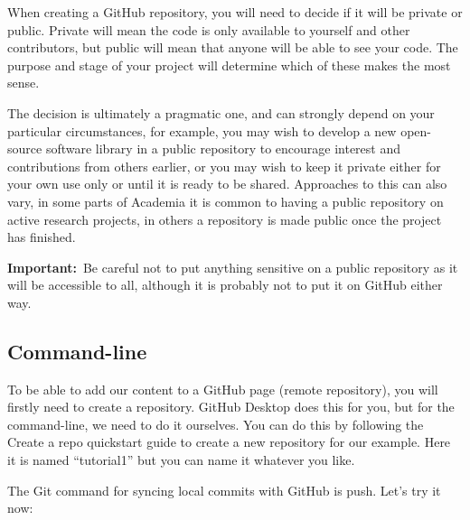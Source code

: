 \documentclass[
  letterpaper,
  DIV=11,
  numbers=noendperiod]{scrartcl}
\begin{document}
\begin{tcolorbox}[enhanced jigsaw, left=2mm, breakable, toptitle=1mm, colback=white, coltitle=black, opacitybacktitle=0.6, leftrule=.75mm, colbacktitle=quarto-callout-caution-color!10!white, rightrule=.15mm, bottomrule=.15mm, bottomtitle=1mm, titlerule=0mm, title=\textcolor{quarto-callout-caution-color}{\faFire}\hspace{0.5em}{\textbf{Private or Public Repository}}, colframe=quarto-callout-caution-color-frame, opacityback=0, arc=.35mm, toprule=.15mm]

When creating a GitHub repository, you will need to decide if it will be
private or public. Private will mean the code is only available to
yourself and other contributors, but public will mean that anyone will
be able to see your code. The purpose and stage of your project will
determine which of these makes the most sense.

The decision is ultimately a pragmatic one, and can strongly depend on
your particular circumstances, for example, you may wish to develop a
new open-source software library in a public repository to encourage
interest and contributions from others earlier, or you may wish to keep
it private either for your own use only or until it is ready to be
shared. Approaches to this can also vary, in some parts of Academia it
is common to having a public repository on active research projects, in
others a repository is made public once the project has finished.

\textbf{Important:}~Be careful not to put anything sensitive on a public
repository as it will be accessible to all, although it is probably not
to put it on GitHub either way.

\end{tcolorbox}

\subsection{Command-line}

To be able to add our content to a GitHub page (remote repository), you
will firstly need to create a repository. GitHub Desktop does this for
you, but for the command-line, we need to do it ourselves. You can do
this by following the Create a repo quickstart guide to create a new
repository for our example. Here it is named ``tutorial1'' but you can
name it whatever you like.

The Git command for syncing local commits with GitHub is push. Let's try
it now:
\end{document}
